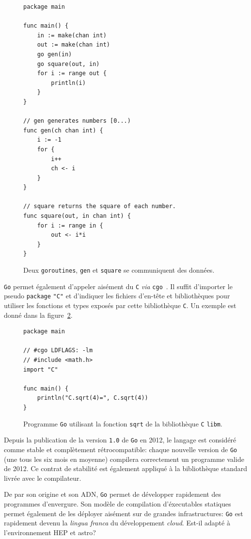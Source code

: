 \documentclass[a4paper,french]{article}
\begin{document}
\begin{figure}[h]
\begin{verbatim}
package main

func main() {
	in := make(chan int)
	out := make(chan int)
	go gen(in)
	go square(out, in)
	for i := range out {
		println(i)
	}
}

// gen generates numbers [0...)
func gen(ch chan int) {
	i := -1
	for {
		i++
		ch <- i
	}
}

// square returns the square of each number.
func square(out, in chan int) {
	for i := range in {
		out <- i*i
	}
}
\end{verbatim}
	\caption{\label{fig-goroutine}Deux \texttt{goroutines}, \texttt{gen} et
	\texttt{square} se communiquent des donn\'ees.}
\end{figure}

\texttt{Go} permet \'egalement d'appeler ais\'ement du \texttt{C} \emph{via}
\texttt{cgo}~\cite{ref-cgo}.
Il suffit d'importer le pseudo \texttt{package} \texttt{"C"} et d'indiquer les
fichiers d'en-t\^ete et biblioth\`eques pour utiliser les fonctions et types
expos\'es par cette biblioth\`eque \texttt{C}.
Un exemple est donn\'e dans la figure~\ref{fig-cgo}.

\begin{figure}[h]
\begin{verbatim}
package main

// #cgo LDFLAGS: -lm
// #include <math.h>
import "C"

func main() {
	println("C.sqrt(4)=", C.sqrt(4))
}
\end{verbatim}
	\caption{\label{fig-cgo}Programme \texttt{Go} utilisant la fonction
	\texttt{sqrt} de la biblioth\`eque \texttt{C} \texttt{libm}.}
\end{figure}

Depuis la publication de la version \texttt{1.0} de \texttt{Go} en 2012, le
langage est consid\'er\'e comme stable et compl\`etement r\'etrocompatible:
chaque nouvelle version de \texttt{Go} (une tous les six mois en moyenne)
compilera correctement un programme valide de 2012.
Ce contrat de stabilit\'e est \'egalement appliqu\'e \`a la biblioth\`eque
standard livr\'ee avec le compilateur.

De par son origine et son ADN, \texttt{Go} permet de d\'evelopper rapidement des
programmes d'envergure.
Son mod\`ele de compilation d'\'executables statiques permet \'egalement de les
d\'eployer ais\'ement sur de grandes infrastructures: \texttt{Go} est rapidement
devenu la \emph{lingua franca} du d\'eveloppement \emph{cloud}.
Est-il adapt\'e \`a l'environnement HEP et astro?
\end{document}
